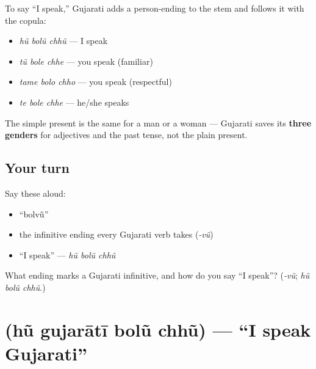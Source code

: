 \begin{grammarlens}[title={Grammar Lens: stem + person + copula}]
To say \textquotedblleft{}I speak,\textquotedblright{} Gujarati adds a person-ending to the stem and follows it with the copula:

\begin{itemize}
\raggedright
  \item \emph{hũ bolũ chhũ} — I speak
  \item \emph{tũ bole chhe} — you speak (familiar)
  \item \emph{tame bolo chho} — you speak (respectful)
  \item \emph{te bole chhe} — he/she speaks
\end{itemize}

The simple present is the same for a man or a woman — Gujarati saves its \textbf{three genders} for adjectives and the past tense, not the plain present.
\end{grammarlens}

\subsection*{Your turn}
Say these aloud:

\begin{itemize}
\raggedright
  \item \textquotedblleft{}bolvũ\textquotedblright{}
  \item the infinitive ending every Gujarati verb takes (\emph{-vũ})
  \item \textquotedblleft{}I speak\textquotedblright{} — \emph{hũ bolũ chhũ}
\end{itemize}

\begin{tcolorbox}[breakable,colback=teal!4,colframe=teal!35!black,title={Before you move on}]
What ending marks a Gujarati infinitive, and how do you say \textquotedblleft{}I speak\textquotedblright{}? (\emph{-vũ}; \emph{hũ bolũ chhũ}.)
\end{tcolorbox}
\section[\gu{હું} \gu{ગુજરાતી} \gu{બોલું} \gu{છું}]{    (hũ gujarātī bolũ chhũ) — \textquotedblleft{}I speak Gujarati\textquotedblright{}}

\label{lesson:GU-C05-hun-gujarati-bolun-chhun}



